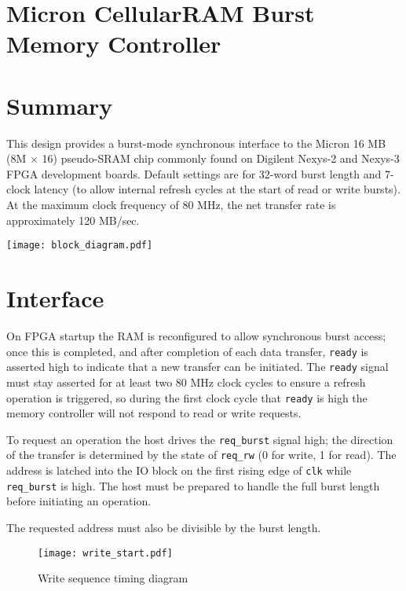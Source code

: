 \documentclass[12pt]{article}
\begin{document}
\section*{Micron CellularRAM Burst Memory Controller}

\section{Summary}

This design provides a burst-mode synchronous interface to the Micron 16 MB (8M $\times$ 16) pseudo-SRAM chip commonly found on Digilent Nexys-2 and Nexys-3 FPGA development boards. Default settings are for 32-word burst length and 7-clock latency (to allow internal refresh cycles at the start of read or write bursts).  At the maximum clock frequency of 80 MHz, the net transfer rate is approximately 120 MB/sec.

\vspace{\baselineskip}
\noindent
\texttt{[image: block\_diagram.pdf]}


\section{Interface}

On FPGA startup the RAM is reconfigured to allow synchronous burst access; once this is completed, and after completion of each data transfer, \texttt{ready} is asserted high to indicate that a new transfer can be initiated. The \texttt{ready} signal must stay asserted for at least two 80 MHz clock cycles to ensure a refresh operation is triggered, so during the first clock cycle that \texttt{ready} is high the memory controller will not respond to read or write requests.

To request an operation the host drives the \texttt{req\_burst} signal high; the direction of the transfer is determined by the state of \texttt{req\_rw} (0 for write, 1 for read). The address is latched into the IO block on the first rising edge of \texttt{clk} while \texttt{req\_burst} is high. The host must be prepared to handle the full burst length before initiating an operation.

The requested address must also be divisible by the burst length.

\pagebreak

\begin{figure}
	\texttt{[image: write\_start.pdf]}
	\caption{Write sequence timing diagram}
\end{figure}
\end{document}
